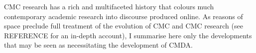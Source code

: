 
			CMC research has a rich and multifaceted history that colours much contemporary academic research into discourse produced online. As reasons of space preclude full treatment of the evolution of CMC and CMC research (see REFERENCE for an in-depth account), I summarise here only the developments that may be seen as necessitating the development of CMDA.


	  

